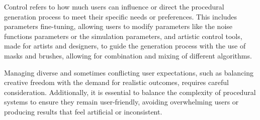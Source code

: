 Control refers to how much users can influence or direct the procedural generation process to meet their specific needs or preferences. This includes parameters fine-tuning, allowing users to modify parameters like the noise functions parameters or the simulation parameters, and artistic control tools, made for artists and designers, to guide the generation process with the use of masks and brushes, allowing for combination and mixing of different algorithms.

Managing diverse and sometimes conflicting user expectations, such as balancing creative freedom with the demand for realistic outcomes, requires careful consideration. Additionally, it is essential to balance the complexity of procedural systems to ensure they remain user-friendly, avoiding overwhelming users or producing results that feel artificial or inconsistent.





